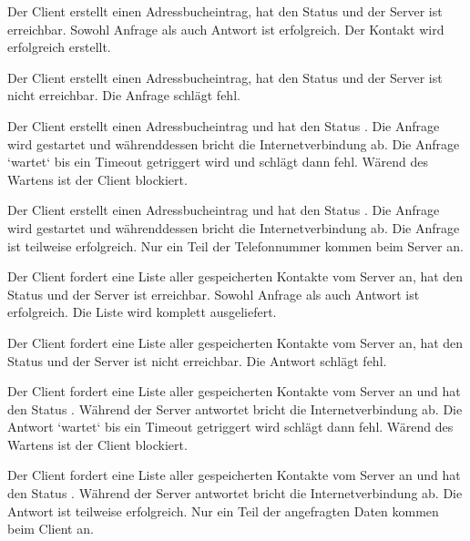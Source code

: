 \begin{description}[leftmargin=0.7cm,style=nextline]
\item[Szenario A0:]
Der Client erstellt einen Adressbucheintrag, hat den Status  und der Server ist erreichbar. Sowohl Anfrage als auch Antwort ist erfolgreich. Der Kontakt wird erfolgreich erstellt.\\
\item[Szenario A1:]
Der Client erstellt einen Adressbucheintrag, hat den Status  und der Server ist nicht erreichbar. Die Anfrage schlägt fehl.\\
\item[Szenario A2:]
Der Client erstellt einen Adressbucheintrag und hat den Status . Die Anfrage wird gestartet und währenddessen bricht die Internetverbindung ab. Die Anfrage `wartet` bis ein Timeout getriggert wird und schlägt dann fehl. Wärend des Wartens ist der Client blockiert.\\
\item[Szenario A3:]
Der Client erstellt einen Adressbucheintrag und hat den Status . Die Anfrage wird gestartet und währenddessen bricht die Internetverbindung ab. Die Anfrage ist teilweise erfolgreich. Nur ein Teil der Telefonnummer kommen beim Server an.\\
\item[Szenario S0:]
Der Client fordert eine Liste aller gespeicherten Kontakte vom Server an, hat den Status  und der Server ist erreichbar. Sowohl Anfrage als auch Antwort ist erfolgreich. Die Liste wird komplett ausgeliefert.\\
\item[Szenario S1:]
Der Client fordert eine Liste aller gespeicherten Kontakte vom Server an, hat den Status  und der Server ist nicht erreichbar. Die Antwort schlägt fehl.\\
\item[Szenario S2:]
Der Client fordert eine Liste aller gespeicherten Kontakte vom Server an und hat den Status . Während der Server antwortet bricht die Internetverbindung ab. Die Antwort `wartet` bis ein Timeout getriggert wird schlägt dann fehl. Wärend des Wartens ist der Client blockiert.\\
\item[Szenario S3:]
Der Client fordert eine Liste aller gespeicherten Kontakte vom Server an und hat den Status . Während der Server antwortet bricht die Internetverbindung ab. Die Antwort ist teilweise erfolgreich. Nur ein Teil der angefragten Daten kommen beim Client an.
\end{description}

